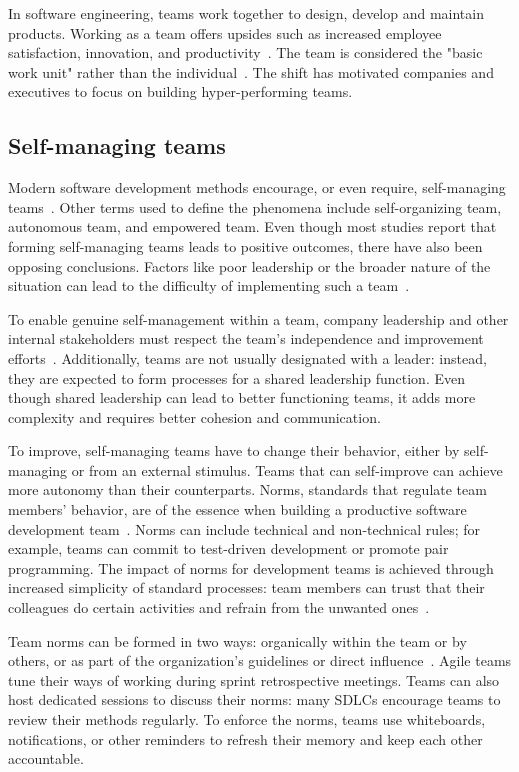 In software engineering, teams work together to design, develop and maintain products. Working as a team offers upsides such as increased employee satisfaction, innovation, and productivity~\cite{moe_teamwork_2010}. The team is considered the "basic work unit" rather than the individual~\cite{moe_overcoming_2010}. The shift has motivated companies and executives to focus on building hyper-performing teams.

\subsection{Self-managing teams}

Modern software development methods encourage, or even require, self-managing teams~\cite{moe_teamwork_2010}. Other terms used to define the phenomena include self-organizing team, autonomous team, and empowered team. Even though most studies report that forming self-managing teams leads to positive outcomes, there have also been opposing conclusions. Factors like poor leadership or the broader nature of the situation can lead to the difficulty of implementing such a team~\cite{moe_teamwork_2010}. 

To enable genuine self-management within a team, company leadership and other internal stakeholders must respect the team's independence and improvement efforts~\cite{moe_overcoming_2010}. Additionally, teams are not usually designated with a leader: instead, they are expected to form processes for a shared leadership function. Even though shared leadership can lead to better functioning teams, it adds more complexity and requires better cohesion and communication.~\cite{solansky_leadership_2008}

To improve, self-managing teams have to change their behavior, either by self-managing or from an external stimulus. Teams that can self-improve can achieve more autonomy than their counterparts. Norms, standards that regulate team members' behavior, are of the essence when building a productive software development team~\cite{abrahamsson_exploring_2016}. Norms can include technical and non-technical rules; for example, teams can commit to test-driven development or promote pair programming. The impact of norms for development teams is achieved through increased simplicity of standard processes: team members can trust that their colleagues do certain activities and refrain from the unwanted ones~\cite{abrahamsson_exploring_2016}. 

Team norms can be formed in two ways: organically within the team or by others, or as part of the organization's guidelines or direct influence~\cite{teh_social_2012}. Agile teams tune their ways of working during sprint retrospective meetings. Teams can also host dedicated sessions to discuss their norms: many SDLCs encourage teams to review their methods regularly. To enforce the norms, teams use whiteboards, notifications, or other reminders to refresh their memory and keep each other accountable.  

